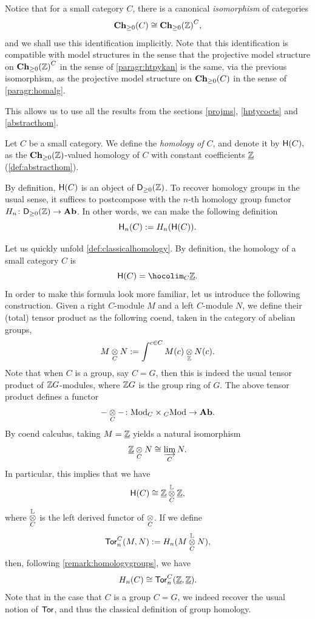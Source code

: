 \begin{paragr}
   Notice that for a small category $C$, there is a canonical
   \emph{isomorphism} of categories
  \[
    \mathbf{Ch}_{\geq 0}(C)\cong {\mathbf{Ch}_{\geq 0}(\mathbb Z)}^{C},
  \]
  and we shall use this identification implicitly. Note that this
  identification is compatible with model structures in the sense that
  the projective model structure on ${\mathbf{Ch}_{\geq 0}(\mathbb Z)}^{C}$ in the sense
  of \ref{paragr:htpykan} is the same, via the previous isomorphism,
  as the projective model structure on $\mathbf{Ch}_{\geq 0}(C)$ in the sense of
  \ref{paragr:homalg}.

  This allows us to use all the results from the sections
  \ref{projms}, \ref{hptycocts} and \ref{abstracthom}. 
\end{paragr}
\begin{definition}\label{def:classicalhomology}
  Let $C$ be a small category. We define
  the \emph{homology of $C$}, and denote it by
    $\mathsf{H}(C),$
  as the $\mathbf{Ch}_{\geq 0}(\mathbb Z)$\nbd-valued homology of $C$ with constant coefficients $\underline{\mathbb Z}$
  (\cref{def:abstracthom}).
\end{definition}
\begin{remark}\label{remark:homologygroups}
  By definition, $\mathsf{H}(C)$ is an object of $\mathsf{D}_{\geq 0}(\mathbb Z)$. To recover
  homology groups in the usual sense, it suffices to postcompose with the $n$-th
  homology group functor $H_n \colon \mathsf{D}_{\geq 0}(\mathbb Z)\to \mathbf{Ab}$. In other
  words, we can make the following definition
  \[
    \mathsf{H}_n(C):=H_n(\mathsf{H}(C)).
  \]
\end{remark}
\begin{paragr}
  Let us quickly unfold \cref{def:classicalhomology}. By definition,
  the homology of a small category $C$ is
  \[
    \Ho(C)=\hocolim_C\cst{\Z}.
  \]
  In order to make this formula look more familiar, let us introduce
  the following construction. Given a right $C$\nbd-module $M$ and a left $C$\nbd-module $N$, we define their (total) tensor product as
  the following coend, taken in the category of abelian groups,
  \[
    M\underset{C}{\otimes}N:=\int^{c \in C}M(c)\underset{\mathbb Z}{\otimes} N(c).
  \]
  Note that when $C$ is a group, say $C=G$, then this is indeed the usual
  tensor product of $\mathbb Z G$\nbd-modules, where $\mathbb Z G$ is the group ring
  of $G$. The above tensor product defines a functor
  \[
    -\underset{C}{\otimes}-\colon \mathrm{Mod}_{C} \times {}_{C}\mathrm{Mod} \to \mathbf{Ab}.
  \]
  By coend calculus, taking $M=\underline{\mathbb Z}$ yields a
  natural isomorphism
  \[
    \underline{\mathbb Z}\underset{C}{\otimes}N \cong \varinjlim_C N.
  \]
  In particular, this implies that we have
  \[
    \mathsf{H}(C)\cong \underline{\mathbb Z} \overset{\mathbb{L}}{\underset{C}{\otimes}} \underline{\mathbb Z},
  \]
  where $\overset{\mathbb{L}}{\underset{C}{\otimes}}$ is the left derived functor of
  $\underset{C}{\otimes}$. If we define
  \[
    \mathsf{Tor}^{C}_{n}(M,N):=H_n(M \overset{\mathbb{L}}{\underset{C}{\otimes}} N),
  \]
  then, following \cref{remark:homologygroups}, we have
  \[
    H_n(C)\cong \mathsf{Tor}^{C}_{n}(\underline{\mathbb Z},\underline{\mathbb Z}).
  \]
  Note that in the case that $C$ is a group $C=G$, we indeed recover
  the usual notion of $\mathsf{Tor}^{}_{}$, and thus the classical definition of
  group homology.
\end{paragr}

